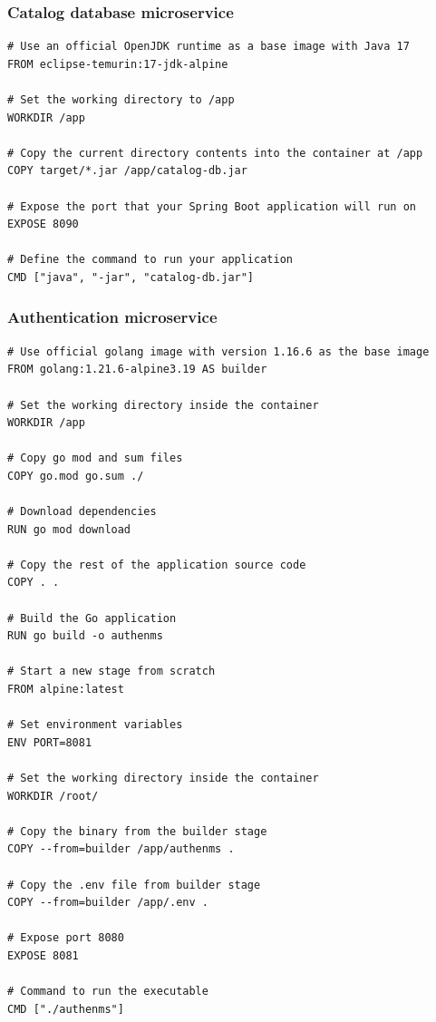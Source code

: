 \subsubsection*{Catalog database microservice}

\begin{lstlisting}[language=docker]
# Use an official OpenJDK runtime as a base image with Java 17
FROM eclipse-temurin:17-jdk-alpine

# Set the working directory to /app
WORKDIR /app

# Copy the current directory contents into the container at /app
COPY target/*.jar /app/catalog-db.jar

# Expose the port that your Spring Boot application will run on
EXPOSE 8090

# Define the command to run your application
CMD ["java", "-jar", "catalog-db.jar"]
\end{lstlisting}

\subsubsection*{Authentication microservice}

\begin{lstlisting}[language=docker]
# Use official golang image with version 1.16.6 as the base image
FROM golang:1.21.6-alpine3.19 AS builder

# Set the working directory inside the container
WORKDIR /app

# Copy go mod and sum files
COPY go.mod go.sum ./

# Download dependencies
RUN go mod download

# Copy the rest of the application source code
COPY . .

# Build the Go application
RUN go build -o authenms

# Start a new stage from scratch
FROM alpine:latest  

# Set environment variables
ENV PORT=8081

# Set the working directory inside the container
WORKDIR /root/

# Copy the binary from the builder stage
COPY --from=builder /app/authenms .

# Copy the .env file from builder stage
COPY --from=builder /app/.env .

# Expose port 8080
EXPOSE 8081

# Command to run the executable
CMD ["./authenms"]
\end{lstlisting}

